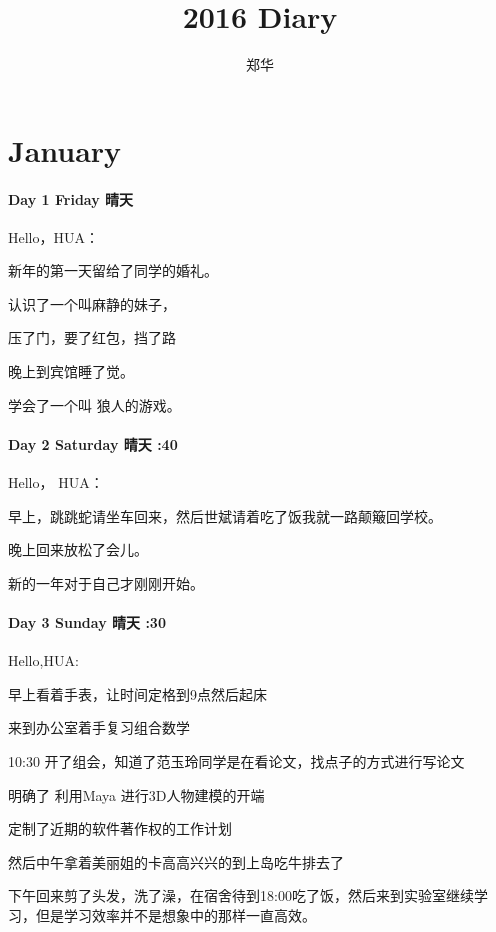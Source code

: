 \documentclass[UTF8,a4paper,8pt]{ctexbook}
\author{郑华}
\title{2016 Diary}
\begin{document}
 	\maketitle
   
 \section*{January}
 
 
 
	 \paragraph{Day 1   Friday   \quad   晴天}
	 
		 Hello，HUA：
		 
		 新年的第一天留给了同学的婚礼。
		 
		 认识了一个叫麻静的妹子，
		 
		 压了门，要了红包，挡了路
		 
		 晚上到宾馆睡了觉。
		 
		 学会了一个叫 狼人的游戏。
	 \paragraph{Day 2   Saturday    \quad     晴天 :40}
		 Hello， HUA：
		 
		 早上，跳跳蛇请坐车回来，然后世斌请着吃了饭我就一路颠簸回学校。
	    
		 晚上回来放松了会儿。
	    
	     新的一年对于自己才刚刚开始。
	 
	 \paragraph{Day 3   Sunday      \quad    晴天  :30 }
		 Hello,HUA:
		 
		 早上看着手表，让时间定格到9点然后起床
		 
		 来到办公室着手复习组合数学
		 
		 10:30 开了组会，知道了范玉玲同学是在看论文，找点子的方式进行写论文
		 
		 明确了 利用Maya 进行3D人物建模的开端
		 
		 定制了近期的软件著作权的工作计划
		 
		 然后中午拿着美丽姐的卡高高兴兴的到上岛吃牛排去了
		 
		 下午回来剪了头发，洗了澡，在宿舍待到18:00吃了饭，然后来到实验室继续学习，但是学习效率并不是想象中的那样一直高效。
		 
\end{document}
